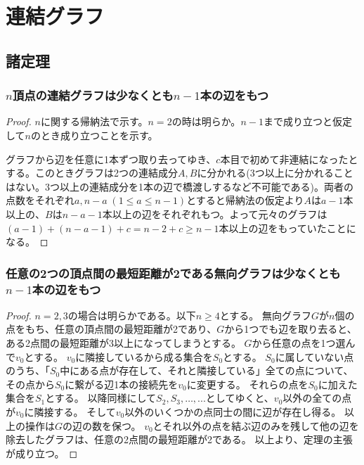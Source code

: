 \chapter{連結グラフ}
    \section{諸定理}
        \subsection{\texorpdfstring{$n$}{n}頂点の連結グラフは少なくとも\texorpdfstring{$n-1$}{n-1}本の辺をもつ}
            \begin{proof}
            \quad\par
                $n$に関する帰納法で示す。$n=2$の時は明らか。$n-1$まで成り立つと仮定して$n$のとき成り立つことを示す。
                \par
                グラフから辺を任意に1本ずつ取り去ってゆき、$c$本目で初めて非連結になったとする。このときグラフは2つの連結成分$A,B$に分かれる(3つ以上に分かれることはない。3つ以上の連結成分を1本の辺で橋渡しするなど不可能である)。両者の点数をそれぞれ$a,n-a\;(1\leq a\leq n-1)$とすると帰納法の仮定より$A$は$a-1$本以上の、$B$は$n-a-1$本以上の辺をそれぞれもつ。よって元々のグラフは$(a-1)+(n-a-1)+c = n-2+c \geq n-1$本以上の辺をもっていたことになる。
            \end{proof}
        \subsection{任意の2つの頂点間の最短距離が2である無向グラフは少なくとも\texorpdfstring{$n-1$}{n-1}本の辺をもつ}
            \begin{proof}
                $n=2,3$の場合は明らかである。以下$n\geq4$とする。
                無向グラフ$G$が$n$個の点をもち、任意の頂点間の最短距離が2であり、$G$から1つでも辺を取り去ると、ある2点間の最短距離が3以上になってしまうとする。
                $G$から任意の点を1つ選んで$v_0$とする。
                $v_0$に隣接しているから成る集合を$S_0$とする。
                $S_0$に属していない点のうち、「$S_0$中にある点が存在して、それと隣接している」全ての点について、その点から$S_0$に繋がる辺1本の接続先を$v_0$に変更する。
                それらの点を$S_0$に加えた集合を$S_1$とする。
                以降同様にして$S_2,S_3,\dotsc,...$としてゆくと、$v_0$以外の全ての点が$v_0$に隣接する。
                そして$v_0$以外のいくつかの点同士の間に辺が存在し得る。
                以上の操作は$G$の辺の数を保つ。
                $v_0$とそれ以外の点を結ぶ辺のみを残して他の辺を除去したグラフは、任意の2点間の最短距離が2である。
                以上より、定理の主張が成り立つ。
            \end{proof}
